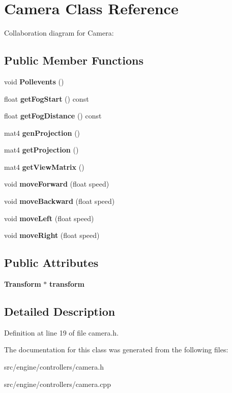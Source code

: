 \section{Camera Class Reference}
\label{class_camera}


Collaboration diagram for Camera\+:
\subsection*{Public Member Functions}
\begin{DoxyCompactItemize}
\item 
\mbox{\label{class_camera_acd5e6f182e1d53b00a3e49309cc13840}} 
void {\bfseries Pollevents} ()
\item 
\mbox{\label{class_camera_af935855e3b4428c63f1b3476392ba779}} 
float {\bfseries get\+Fog\+Start} () const
\item 
\mbox{\label{class_camera_aceb48d1800fb0dc5def8106cf44b5410}} 
float {\bfseries get\+Fog\+Distance} () const
\item 
\mbox{\label{class_camera_afdfa02f30c51c3dbd0fcf3cefacc63d4}} 
mat4 {\bfseries gen\+Projection} ()
\item 
\mbox{\label{class_camera_acbc91dfa7ab3219790e83bf01e06e8aa}} 
mat4 {\bfseries get\+Projection} ()
\item 
\mbox{\label{class_camera_a26c21a39c99b37158c16b0b16a3b0a56}} 
mat4 {\bfseries get\+View\+Matrix} ()
\item 
\mbox{\label{class_camera_ac15a7a928d4124ffaa3833784a555551}} 
void {\bfseries move\+Forward} (float speed)
\item 
\mbox{\label{class_camera_a527c0bc2524f2f6c8dcc7777d0446e1f}} 
void {\bfseries move\+Backward} (float speed)
\item 
\mbox{\label{class_camera_a25147d34846797e2d8411627cb135442}} 
void {\bfseries move\+Left} (float speed)
\item 
\mbox{\label{class_camera_a789a4deba3b81545f4b9ec550794c164}} 
void {\bfseries move\+Right} (float speed)
\end{DoxyCompactItemize}
\subsection*{Public Attributes}
\begin{DoxyCompactItemize}
\item 
\mbox{\label{class_camera_a40e08b279520335b163104f9c5b247ef}} 
\textbf{ Transform} $\ast$ {\bfseries transform}
\end{DoxyCompactItemize}


\subsection{Detailed Description}


Definition at line 19 of file camera.\+h.



The documentation for this class was generated from the following files\+:\begin{DoxyCompactItemize}
\item 
src/engine/controllers/camera.\+h\item 
src/engine/controllers/camera.\+cpp\end{DoxyCompactItemize}

